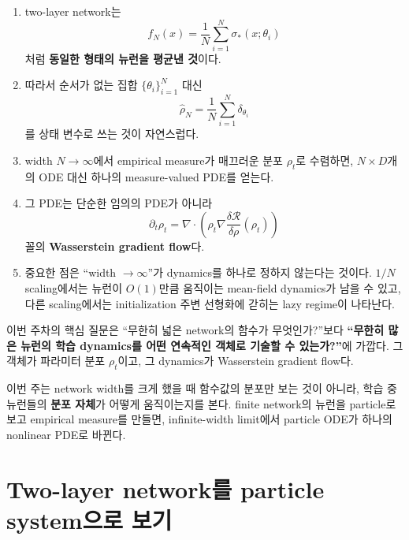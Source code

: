 \documentclass[11pt,a4paper,oneside,openany]{memoir}
\newcommand{\Risk}{\mathcal{R}}
\newcommand{\grad}{\nabla}
\newcommand{\diver}{\nabla\!\cdot}
\theoremstyle{definition}
\begin{document}
\begin{enumerate}
  \item two-layer network는
  \[
    f_N(x)=\frac1N\sum_{i=1}^N \sigma_*(x;\theta_i)
  \]
  처럼 \textbf{동일한 형태의 뉴런을 평균낸 것}이다.

  \item 따라서 순서가 없는 집합 $\{\theta_i\}_{i=1}^N$ 대신
  \[
    \hat\rho_N=\frac1N\sum_{i=1}^N\delta_{\theta_i}
  \]
  를 상태 변수로 쓰는 것이 자연스럽다.

  \item width $N\to\infty$에서 empirical measure가 매끄러운 분포 $\rho_t$로 수렴하면,
  $N\times D$개의 ODE 대신 하나의 measure-valued PDE를 얻는다.

  \item 그 PDE는 단순한 임의의 PDE가 아니라
  \[
    \partial_t\rho_t
    =\diver\!\left(\rho_t\grad\frac{\delta\Risk}{\delta\rho}(\rho_t)\right)
  \]
  꼴의 \textbf{Wasserstein gradient flow}다.

  \item 중요한 점은 ``width $\to\infty$''가 dynamics를 하나로 정하지 않는다는 것이다.
  $1/N$ scaling에서는 뉴런이 $O(1)$만큼 움직이는 mean-field dynamics가 남을 수 있고,
  다른 scaling에서는 initialization 주변 선형화에 갇히는 lazy regime이 나타난다.
\end{enumerate}

\begin{keybox}
이번 주차의 핵심 질문은 ``무한히 넓은 network의 함수가 무엇인가?''보다
\textbf{``무한히 많은 뉴런의 학습 dynamics를 어떤 연속적인 객체로 기술할 수 있는가?''}에 가깝다.
그 객체가 파라미터 분포 $\rho_t$이고, 그 dynamics가 Wasserstein gradient flow다.
\end{keybox}

\begin{presentbox}
이번 주는 network width를 크게 했을 때 함수값의 분포만 보는 것이 아니라, 학습 중 뉴런들의
\textbf{분포 자체}가 어떻게 움직이는지를 본다. finite network의 뉴런을 particle로 보고 empirical
measure를 만들면, infinite-width limit에서 particle ODE가 하나의 nonlinear PDE로 바뀐다.
\end{presentbox}

\chapter{Two-layer network를 particle system으로 보기}
\end{document}
